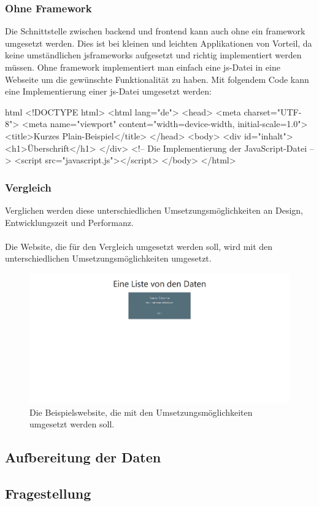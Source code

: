 \subsubsection{Ohne Framework}
Die Schnittstelle zwischen \Gls{backend} und \Gls{frontend} kann auch ohne ein \Gls{framework} umgesetzt werden. Dies ist bei kleinen und leichten Applikationen von Vorteil, da keine umständlichen \Gls{jsframework}s aufgesetzt und richtig implementiert werden müssen. Ohne \Gls{framework} implementiert man einfach eine \Gls{js}-Datei in eine Webseite um die gewünschte Funktionalität zu haben. Mit folgendem Code kann eine Implementierung einer \Gls{js}-Datei umgesetzt werden:
\begin{code}{html}
	<!DOCTYPE html>
	<html lang="de">
		<head>
			<meta charset="UTF-8">
			<meta name="viewport" content="width=device-width, initial-scale=1.0">
			<title>Kurzes Plain-Beispiel</title>
		</head>
		<body>
			<div id="inhalt">
				<h1>Überschrift</h1>
			</div>
			<!-- Die Implementierung der JavaScript-Datei -->
			<script src="javascript.js"></script>
		</body>
	</html>
\end{code}
\subsubsection{Vergleich}
Verglichen werden diese unterschiedlichen Umsetzungsmöglichkeiten an Design, Entwicklungszeit und Performanz.\\\\
Die Website, die für den Vergleich umgesetzt werden soll, wird mit den unterschiedlichen Umsetzungsmöglichkeiten umgesetzt.\\
\begin{figure}[H]
	\centering
	\includegraphics[width=0.8\linewidth]{images/example_page}
	\caption[Die Besipielswebsite]{Die Beispielswebsite, die mit den Umsetzungsmöglichkeiten umgesetzt werden soll.}
	\label{fig:example}
\end{figure}
\subsection{Aufbereitung der Daten}
\subsection{Fragestellung}